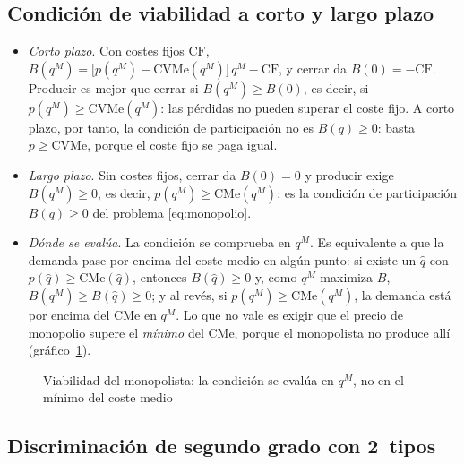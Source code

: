 \documentclass[11pt]{article}
\begin{document}
\subsection{Condición de viabilidad a corto y largo plazo}\label{anexo:viabilidad}

\begin{itemize}
\item \emph{Corto plazo}. Con costes fijos $\mathrm{CF}$, $B(q^M)=\big[p(q^M)-\mathrm{CVMe}(q^M)\big]\,q^M-\mathrm{CF}$, y cerrar da $B(0)=-\mathrm{CF}$. Producir es mejor que cerrar si $B(q^M)\geq B(0)$, es decir, si $p(q^M)\geq\mathrm{CVMe}(q^M)$: las pérdidas no pueden superar el coste fijo. A corto plazo, por tanto, la condición de participación no es $B(q)\geq 0$: basta $p\geq\mathrm{CVMe}$, porque el coste fijo se paga igual.
\item \emph{Largo plazo}. Sin costes fijos, cerrar da $B(0)=0$ y producir exige $B(q^M)\geq 0$, es decir, $p(q^M)\geq\mathrm{CMe}(q^M)$: es la condición de participación $B(q)\geq 0$ del problema \eqref{eq:monopolio}.
\item \emph{Dónde se evalúa}. La condición se comprueba en $q^M$. Es equivalente a que la demanda pase por encima del coste medio en algún punto: si existe un $\hat{q}$ con $p(\hat{q})\geq\mathrm{CMe}(\hat{q})$, entonces $B(\hat{q})\geq 0$ y, como $q^M$ maximiza $B$, $B(q^M)\geq B(\hat{q})\geq 0$; y al revés, si $p(q^M)\geq\mathrm{CMe}(q^M)$, la demanda está por encima del CMe en $q^M$. Lo que no vale es exigir que el precio de monopolio supere el \emph{mínimo} del CMe, porque el monopolista no produce allí (gráfico~\ref{fig:viabilidad-monopolio}).\findemo
\end{itemize}

\begin{figure}[H]
\centering
\caption{Viabilidad del monopolista: la condición se evalúa en $q^M$, no en el mínimo del coste medio}\label{fig:viabilidad-monopolio}
\end{figure}

\subsection{Discriminación de segundo grado con 2~tipos}\label{anexo:segundo-grado}
\end{document}
